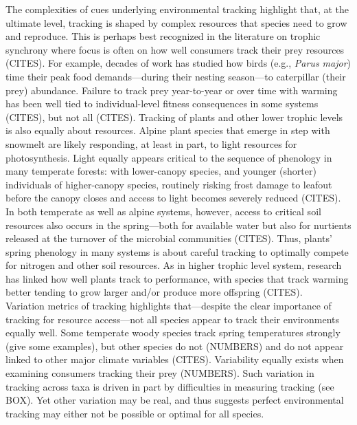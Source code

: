 \documentclass[11pt,letterpaper]{article}
\begin{document}
The complexities of cues underlying environmental tracking highlight that, at the ultimate level, tracking is shaped by complex resources that species need to grow and reproduce. This is perhaps best recognized in the literature on trophic synchrony where focus is often on how well consumers track their prey resources (CITES). For example, decades of work has studied how birds (e.g., \emph{Parus major}) time their peak food demands---during their nesting season---to caterpillar (their prey) abundance. Failure to track prey year-to-year or over time with warming has been well tied to individual-level fitness consequences in some systems (CITES), but not all (CITES). Tracking of plants and other lower trophic levels is also equally about resources. Alpine plant species that emerge in step with snowmelt are likely responding, at least in part, to light resources for photosynthesis. Light equally appears critical to the sequence of phenology in many temperate forests: with lower-canopy species, and younger (shorter) individuals of higher-canopy species, routinely risking frost damage to leafout before the canopy closes and access to light becomes severely reduced (CITES). In both temperate as well as alpine systems, however, access to critical soil resources also occurs in the spring---both for available water but also for nurtients released at the turnover of the microbial communities (CITES). Thus, plants' spring phenology in many systems is about careful tracking to optimally compete for nitrogen and other soil resources. As in higher trophic level system, research has linked how well plants track to performance, with species that track warming better tending to grow larger and/or produce more offspring (CITES).
\\
Variation metrics of tracking highlights that---despite the clear importance of tracking for resource access---not all species appear to track their environments equally well. Some temperate woody species track spring temperatures strongly (give some examples), but other species do not (NUMBERS) and do not appear linked to other major climate variables (CITES). Variability equally exists when examining consumers tracking their prey (NUMBERS). Such variation in tracking across taxa is driven in part by difficulties in measuring tracking (see BOX). Yet other variation may be real, and thus suggests perfect environmental tracking may either not be possible or optimal for all species. 
\end{document}
